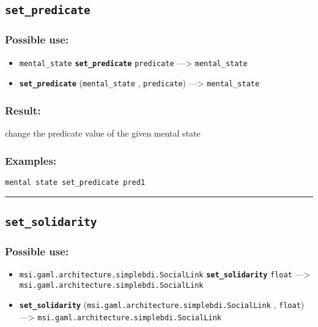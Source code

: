 \documentclass[]{book}
\providecommand{\tightlist}{%
  \setlength{\itemsep}{0pt}\setlength{\parskip}{0pt}}
\theoremstyle{definition}
\theoremstyle{definition}
\theoremstyle{definition}
\theoremstyle{remark}
\begin{document}
\subsection{\texorpdfstring{\texttt{set\_predicate}}{set\_predicate}}\label{set_predicate}

\subsubsection{Possible use:}\label{possible-use-464}

\begin{itemize}
\tightlist
\item
  \texttt{mental\_state} \textbf{\texttt{set\_predicate}}
  \texttt{predicate} ---\textgreater{} \texttt{mental\_state}
\item
  \textbf{\texttt{set\_predicate}} (\texttt{mental\_state} ,
  \texttt{predicate}) ---\textgreater{} \texttt{mental\_state}
\end{itemize}

\subsubsection{Result:}\label{result-448}

change the predicate value of the given mental state

\subsubsection{Examples:}\label{examples-321}

\begin{verbatim}
mental state set_predicate pred1 
\end{verbatim}

\begin{center}\rule{0.5\linewidth}{\linethickness}\end{center}

\subsection{\texorpdfstring{\texttt{set\_solidarity}}{set\_solidarity}}\label{set_solidarity}

\subsubsection{Possible use:}\label{possible-use-465}

\begin{itemize}
\tightlist
\item
  \texttt{msi.gaml.architecture.simplebdi.SocialLink}
  \textbf{\texttt{set\_solidarity}} \texttt{float} ---\textgreater{}
  \texttt{msi.gaml.architecture.simplebdi.SocialLink}
\item
  \textbf{\texttt{set\_solidarity}}
  (\texttt{msi.gaml.architecture.simplebdi.SocialLink} , \texttt{float})
  ---\textgreater{} \texttt{msi.gaml.architecture.simplebdi.SocialLink}
\end{itemize}
\end{document}
